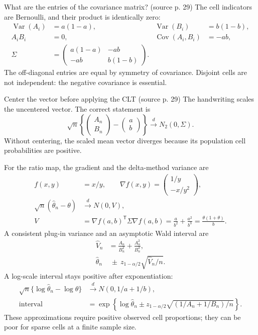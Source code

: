 \documentclass[12pt]{article}
\DeclareMathOperator{\Var}{Var}
\begin{document}
\begin{todobox}{What are the entries of the covariance matrix? (source p. 29)}
The cell indicators are Bernoulli, and their product is identically zero:
\begin{align}
 \Var(A_i)&=a(1-a),&\Var(B_i)&=b(1-b),\\
 A_iB_i&=0,&\operatorname{Cov}(A_i,B_i)&=-ab,\\
 \Sigma&=\begin{pmatrix}a(1-a)&-ab\\-ab&b(1-b)\end{pmatrix}.
\end{align}
The off-diagonal entries are equal by symmetry of covariance. Disjoint
cells are not independent: the negative covariance is essential.
\end{todobox}
\begin{correctionbox}{Center the vector before applying the CLT (source p. 29)}
The handwriting scales the uncentered vector. The correct statement is
\begin{equation}
 \sqrt n\left\{\begin{pmatrix}A_n\\B_n\end{pmatrix}
              -\begin{pmatrix}a\\b\end{pmatrix}\right\}
 \xrightarrow{d}N_2(0,\Sigma).
\end{equation}
Without centering, the scaled mean vector diverges because its population
cell probabilities are positive.
\end{correctionbox}
For the ratio map, the gradient and the delta-method variance are
\begin{align}
 f(x,y)&=x/y,\qquad
 \nabla f(x,y)=\begin{pmatrix}1/y\\-x/y^2\end{pmatrix},\\
 \sqrt n(\widehat\theta_n-\theta)&\xrightarrow{d}N(0,V),\\
 V&=\nabla f(a,b)^{\mathsf T}\Sigma\nabla f(a,b)
 =\frac{a}{b^2}+\frac{a^2}{b^3}
 =\frac{\theta(1+\theta)}b.
\end{align}
A consistent plug-in variance and an asymptotic Wald interval are
\begin{align}
 \widehat V_n&=\frac{A_n}{B_n^2}+\frac{A_n^2}{B_n^3},\\
 \widehat\theta_n&\ \mathbin{\pm}\ z_{1-\alpha/2}\sqrt{\widehat V_n/n}.
\end{align}
A log-scale interval stays positive after exponentiation:
\begin{align}
 \sqrt n\{\log\widehat\theta_n-\log\theta\}
 &\xrightarrow{d}N(0,1/a+1/b),\\
 \text{interval}&=\exp\!\left\{\log\widehat\theta_n
 \mathbin{\pm}z_{1-\alpha/2}\sqrt{(1/A_n+1/B_n)/n}\right\}.
\end{align}
These approximations require positive observed cell proportions; they can
be poor for sparse cells at a finite sample size.
\end{document}
